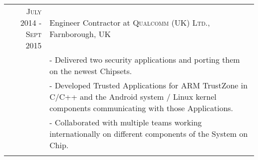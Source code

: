 \documentclass[a4paper,10pt]{article} %
\begin{document}
\begin{tabular}{r|p{11cm}}
    \textsc{July 2014 - Sept 2015} & Engineer Contractor at \textsc{Qualcomm (UK) Ltd.}, Farnborough, UK\\ 
                              & \footnotesize{
                                - Delivered two security applications and
                                porting them on the newest Chipsets.}\\
                              & \footnotesize{
                                - Developed Trusted Applications for ARM
                                TrustZone in C/C++ and the Android system /
                                Linux kernel components
                                communicating with those Applications.} \\
                              & \footnotesize{
                                - Collaborated with
                                multiple teams working internationally on
                                different components of the System on Chip.}\\
\multicolumn{2}{c}{} \\



\end{tabular}

\end{document}
